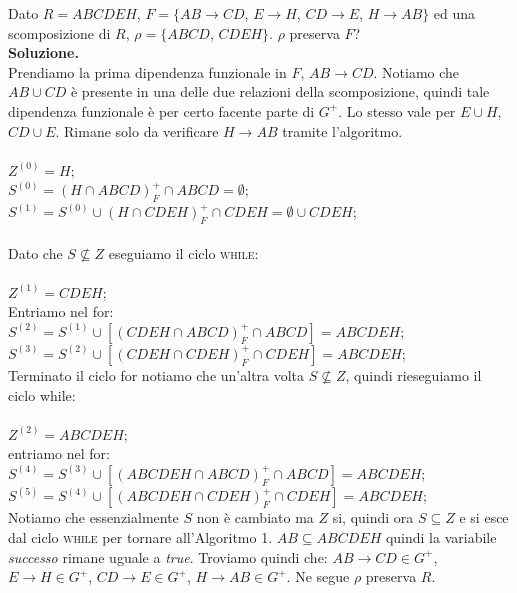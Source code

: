 \begin{exmp}
Dato $R=ABCDEH$, $F=\{AB\rightarrow CD$, $E \rightarrow H$, $CD\rightarrow E$, $H\rightarrow AB\}$ ed una scomposizione
di $R$, $\rho=\{ABCD$, $CDEH\}$. $\rho$ preserva $F$?\\

\noindent \textbf{Soluzione.}\\
Prendiamo la prima dipendenza funzionale in $F$, $AB\rightarrow CD$. Notiamo che $AB \cup CD$ è presente in una delle due
relazioni della scomposizione, quindi tale dipendenza funzionale è per certo facente parte di $G^+$. Lo stesso vale per
$E\cup H$, $CD\cup E$. Rimane solo da verificare $H\rightarrow AB$ tramite l'algoritmo.\\\\
$Z^{(0)}= H$;\\
$S^{(0)} = (H \cap ABCD)^+_F \cap ABCD = \emptyset$;\\
$S^{(1)} = S^{(0)} \cup (H \cap CDEH)^+_F \cap CDEH = \emptyset \cup CDEH$;\\\\
Dato che $S\not\subseteq Z$ eseguiamo il ciclo \textsc{while}:\\\\
$Z^{(1)}= CDEH$;\\
Entriamo nel for:\\
\indent $S^{(2)} = S^{(1)} \cup [(CDEH \cap ABCD)^+_F \cap ABCD] = ABCDEH$;\\
\indent $S^{(3)} = S^{(2)} \cup [(CDEH \cap CDEH)^+_F \cap CDEH] = ABCDEH$;\\

\noindent Terminato il ciclo for notiamo che un'altra volta $S\not\subseteq Z$, quindi rieseguiamo il ciclo while:\\\\
$Z^{(2)}= ABCDEH$;\\
entriamo nel for:\\
\indent $S^{(4)} = S^{(3)} \cup [(ABCDEH \cap ABCD)^+_F \cap ABCD] = ABCDEH$;\\
\indent $S^{(5)} = S^{(4)} \cup [(ABCDEH \cap CDEH)^+_F \cap CDEH] = ABCDEH$;\\

\noindent Notiamo che essenzialmente $S$ non è cambiato ma $Z$ si, quindi ora $S \subseteq Z$ e si 
esce dal ciclo \textsc{while} per tornare all'Algoritmo 1. $AB\subseteq ABCDEH$ 
quindi la variabile \emph{successo} rimane uguale a \emph{true}. Troviamo quindi che: 
$AB\rightarrow CD \in G^+$, $E \rightarrow H  \in G^+$, 
$CD\rightarrow E \in G^+$, $H\rightarrow AB  \in G^+$. Ne segue $\rho$ preserva $R$.
\end{exmp}


